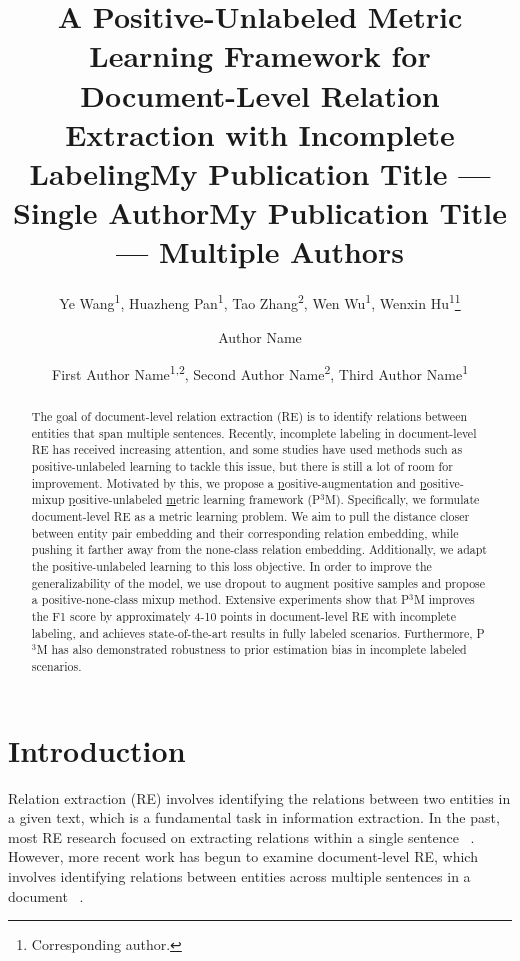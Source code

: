 \documentclass[letterpaper]{article}
\title{A Positive-Unlabeled Metric Learning Framework for \\Document-Level Relation Extraction with Incomplete Labeling}
\author{
    Ye Wang\textsuperscript{\rm 1},
    Huazheng Pan\textsuperscript{\rm 1},
    Tao Zhang\textsuperscript{\rm 2},
    Wen Wu\textsuperscript{\rm 1},
    Wenxin Hu\textsuperscript{\rm 1}\thanks{Corresponding author.}
}
\title{My Publication Title --- Single Author}
\author {
    Author Name
}
\title{My Publication Title --- Multiple Authors}
\author {
    First Author Name\textsuperscript{\rm 1,\rm 2},
    Second Author Name\textsuperscript{\rm 2},
    Third Author Name\textsuperscript{\rm 1}
}
\begin{document}
\maketitle

\begin{abstract}
The goal of document-level relation extraction (RE) is to identify relations between entities that span multiple sentences. Recently, incomplete labeling in document-level RE has received increasing attention, and some studies have used methods such as positive-unlabeled learning to tackle this issue, but there is still a lot of room for improvement. Motivated by this, we propose a \underline{p}ositive-augmentation and \underline{p}ositive-mixup \underline{p}ositive-unlabeled \underline{m}etric learning framework (P$^{3}$M). Specifically, we formulate document-level RE as a metric learning problem. We aim to pull the distance closer between entity pair embedding and their corresponding relation embedding, while pushing it farther away from the none-class relation embedding. Additionally, we adapt the positive-unlabeled learning to this loss objective. In order to improve the generalizability of the model, we use dropout to augment positive samples and propose a positive-none-class mixup method. Extensive experiments show that P$^{3}$M improves the F1 score by approximately 4-10 points in document-level RE with incomplete labeling, and achieves state-of-the-art results in fully labeled scenarios. Furthermore, P$^{3}$M has also demonstrated robustness to prior estimation bias in incomplete labeled scenarios.
\end{abstract}

\section{Introduction}

Relation extraction (RE) involves identifying the relations between two entities in a given text, which is a fundamental task in information extraction. In the past, most RE research focused on extracting relations within a single sentence ~\cite{DBLP:conf/acl/MiwaB16, DBLP:conf/emnlp/Zhang0M18}. However, more recent work has begun to examine document-level RE, which involves identifying relations between entities across multiple sentences in a document ~\cite{DBLP:conf/acl/YaoYLHLLLHZS19, DBLP:conf/aaai/Zhou0M021, DBLP:conf/naacl/XuCMZ22,DBLP:conf/naacl/YuYT22,DBLP:conf/ijcai/ZhouL22}.
\end{document}
